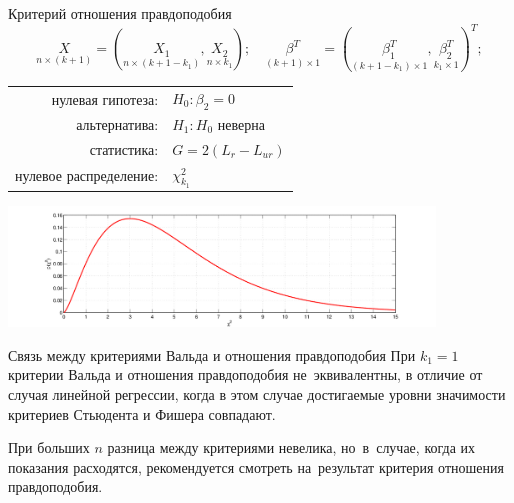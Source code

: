 \documentclass[9pt,pdf,utf8,hyperref={unicode},aspectratio=169]{beamer}
\begin{document}
\begin{frame}{Критерий отношения правдоподобия}
    $$\underset{n\times (k+1)}{X} = \left(\underset{n\times \left(k+1-k_1\right)}{X_1} , \underset{n\times k_1}{X_2}\right); \quad \underset{(k+1)\times 1}{\beta^T} = \left(\underset{\left(k+1-k_1\right)\times 1}{\beta_1^T}, \underset{k_1\times 1}{\beta_2^T} \right)^T;$$
    \begin{center}
        \begin{tabular}{rl}
            нулевая гипотеза:               & $H_0\colon \beta_2=0$ \\
            альтернатива:                   & $H_1\colon H_0$ неверна\\
            статистика:                     & $G = 2 \left(L_{r} - L_{ur}\right)$\\
            нулевое распределение:          & $\chi^2_{k_1}$\\
        \end{tabular}
        \includegraphics[width=0.85\textwidth]{chi2.png}   
    \end{center}
\end{frame}

\begin{frame}{Связь между критериями Вальда и отношения правдоподобия}
    При $k_1=1$ критерии Вальда и отношения правдоподобия не~эквивалентны, в отличие от случая линейной регрессии, когда в этом случае достигаемые уровни значимости критериев Стьюдента и Фишера совпадают.

    \bigskip

   При больших $n$ разница между критериями невелика, но~в~случае, когда их показания расходятся, рекомендуется смотреть на~результат критерия отношения правдоподобия.
\end{frame}
\end{document}
